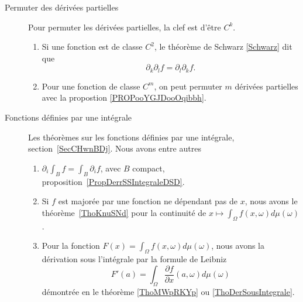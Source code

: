         \label{THEMEooJGEHooNzQkMT}
\begin{description}
	\item[Permuter des dérivées partielles]
		Pour permuter les dérivées partielles, la clef est d'être \( C^k\).
		\begin{enumerate}
			\item
			      Si une fonction est de classe \( C^2\), le théorème de Schwarz \ref{Schwarz} dit que
			      \begin{equation}
				      \partial_k\partial_lf=\partial_l\partial_kf.
			      \end{equation}
			\item
			      Pour une fonction de classe \( C^m\), on peut permuter \( m\) dérivées partielles avec la propostion \ref{PROPooYGJDooOqibbh}.
		\end{enumerate}
	\item[Fonctions définies par une intégrale]
		Les théorèmes sur les fonctions définies par une intégrale, section~\ref{SecCHwnBDj}. Nous avons entre autres
		\begin{enumerate}
			\item
			      \( \partial_i\int_Bf=\int_B\partial_if\), avec \( B\) compact, proposition~\ref{PropDerrSSIntegraleDSD}.
			\item
			      Si \( f\) est majorée par une fonction ne dépendant pas de \( x\), nous avons le théorème~\ref{ThoKnuSNd} pour la continuité de \( x\mapsto \int_{\Omega}f(x,\omega)d\mu(\omega)\).
			\item
			      Pour la fonction \( F(x)=\int_{\Omega}f(x,\omega)d\mu(\omega)\), nous avons la dérivation sous l'intégrale par la formule de Leibniz
			      \begin{equation}
				      F'(a)=\int_{\Omega}\frac{ \partial f }{ \partial x }(a,\omega)d\mu(\omega)
			      \end{equation}
			      démontrée en le théorème \ref{ThoMWpRKYp} ou \ref{ThoDerSousIntegrale}.


\end{enumerate}
\end{description}

